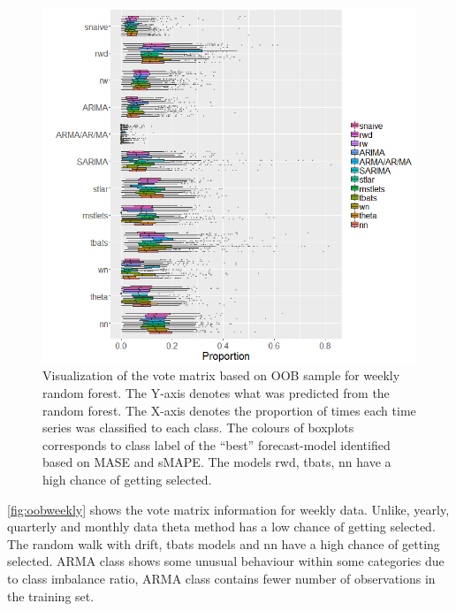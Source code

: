 \documentclass[11pt,a4paper,]{article}
\begin{document}
\begin{figure}
\centering
\includegraphics{figures/oobweekly-1.png}
\caption{\label{fig:oobweekly}Visualization of the vote matrix based on OOB sample for weekly random forest. The Y-axis denotes what was predicted from the random forest. The X-axis denotes the proportion of times each time series was classified to each class. The colours of boxplots corresponds to class label of the ``best'' forecast-model identified based on MASE and sMAPE. The models rwd, tbats, nn have a high chance of getting selected.}
\end{figure}

\autoref{fig:oobweekly} shows the vote matrix information for weekly data. Unlike, yearly, quarterly and monthly data theta method has a low chance of getting selected. The random walk with drift, tbats models and nn have a high chance of getting selected. ARMA class shows some unusual behaviour within some categories due to class imbalance ratio, ARMA class contains fewer number of observations in the training set.
\end{document}
